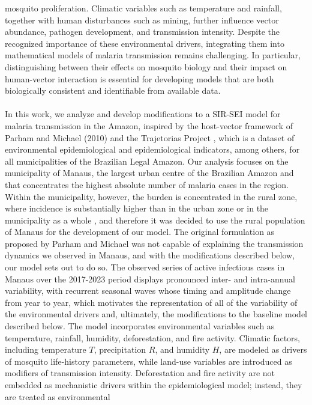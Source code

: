 \documentclass[a4paper,fleqn]{cas-dc}
\begin{document}
mosquito proliferation. Climatic variables such as temperature and rainfall, together with human disturbances such
as mining, further influence vector abundance, pathogen development, and transmission intensity. Despite the
recognized importance of these environmental drivers, integrating them into mathematical models of malaria
transmission remains challenging. In particular, distinguishing between their effects on mosquito biology and their
impact on human-vector interaction is essential for developing models that are both biologically consistent and
identifiable from available data.
\\\\
In this work, we analyze and develop modifications to a SIR-SEI model for malaria transmission in the Amazon, inspired by the
host-vector framework of Parham and Michael (2010) \cite{Parham2010} and the Trajetorias Project \cite{Rorato2023}, which is
a dataset of environmental epidemiological and epidemiological indicators, among others, for all municipalities of the Brazilian Legal Amazon.
Our analysis focuses on the municipality of Manaus, the largest urban centre of the Brazilian Amazon and that concentrates the highest absolute number of malaria cases in the region. Within the municipality, however, the burden is concentrated in the rural zone, where incidence is substantially higher than in the urban zone or in the municipality as a whole \cite{Rorato2023}, and therefore it was decided to use the rural population of Manaus for the development of our model.
The original formulation as proposed by Parham and Michael was not capable 
of explaining the transmission dynamics we observed in
Manaus, and with the modifications described below, our model sets out to do so. The observed series of active infectious cases in Manaus over the 2017-2023 period 
displays pronounced inter- and intra-annual variability, with recurrent seasonal waves whose timing and amplitude change from year to year, which motivates the 
representation of all of the variability of the environmental drivers and, ultimately, the modifications to the baseline model described below. The model incorporates environmental
variables such as temperature, rainfall, humidity, deforestation, and fire activity. Climatic factors, including
temperature $T$, precipitation $R$, and humidity $H$, are modeled as drivers of mosquito life-history parameters,
while land-use variables are introduced as modifiers of transmission intensity. Deforestation and fire activity are
not embedded as mechanistic drivers within the epidemiological model; instead, they are treated as environmental
\end{document}
